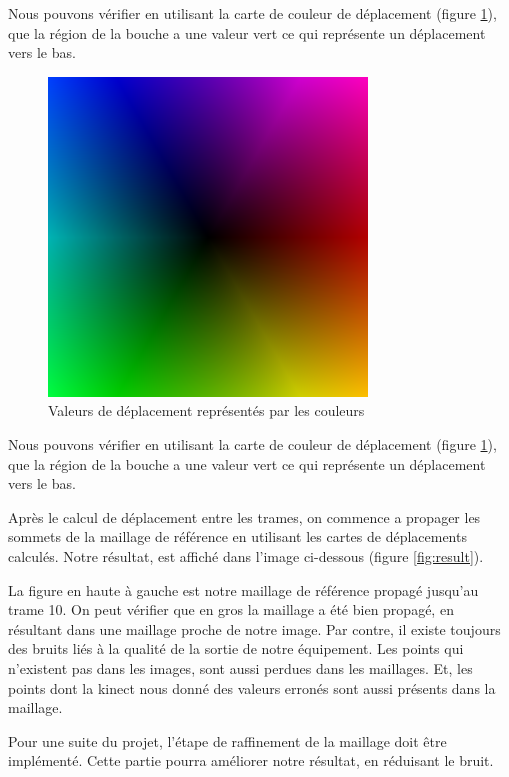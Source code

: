 \documentclass[a4paper,12pt]{article}
\begin{document}
Nous pouvons vérifier en utilisant la carte de couleur de déplacement
(figure \ref{fig:colorChart}), que la région de la bouche a une valeur
vert ce qui représente un déplacement vers le bas.

\begin{figure}[h!]
  \begin{center}
    \includegraphics[scale=0.6]{img/ColorChart}
    \caption{Valeurs de déplacement représentés par les couleurs}
    \label{fig:colorChart}
  \end{center}
\end{figure}

Nous pouvons vérifier en utilisant la carte de couleur de déplacement
(figure \ref{fig:colorChart}), que la région de la bouche a une valeur
vert ce qui représente un déplacement vers le bas.

Après le calcul de déplacement entre les trames, on commence a
propager les sommets de la maillage de référence en utilisant les
cartes de déplacements calculés. Notre résultat, est affiché dans
l'image ci-dessous (figure \ref{fig:result}). 

La figure en haute à gauche est notre maillage de référence propagé
jusqu'au trame 10. On peut vérifier que en gros la maillage a été bien
propagé, en résultant dans une maillage proche de notre image.
Par contre, il existe toujours des bruits liés à la qualité de la
sortie de notre équipement. Les points qui n'existent pas dans les
images, sont aussi perdues dans les maillages. Et, les points dont la
kinect nous donné des valeurs erronés sont aussi présents dans la maillage. 

Pour une suite du projet, l'étape de raffinement de la maillage doit
être implémenté. Cette partie pourra améliorer notre résultat, en
réduisant le bruit.
\end{document}
